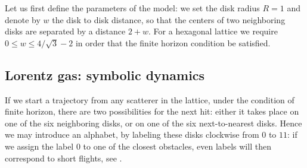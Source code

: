 {Let us first define the parameters of the model: we set the disk
radius $R=1$ and denote by $w$ the disk to disk distance, so that the
centers of two neighboring disks are separated by a distance
$2+w$. For a hexagonal lattice we require $0\leq w \leq 4/\sqrt{3}-2$
in order that the finite horizon condition be satisfied.

\subsection{Lorentz gas: symbolic dynamics}

If we start a trajectory from any scatterer in the lattice, under the
condition of finite horizon, there are two possibilities for the next
hit: either it takes place on one of the six neighboring disks, or on
one of the six next-to-nearest disks. Hence we may introduce an
alphabet, by labeling these disks clockwise from $0$ to $11$: if we
assign the label $0$ to one of the closest obstacles, even labels will
then correspond to short flights, see .

}
